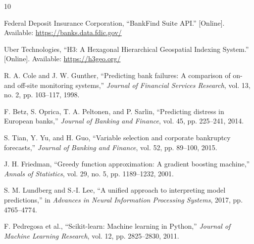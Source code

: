 \documentclass[conference]{IEEEtran}
\begin{document}
\begin{thebibliography}{10}

Federal Deposit Insurance Corporation, ``BankFind Suite API.''
[Online]. Available: \url{https://banks.data.fdic.gov/}

Uber Technologies, ``H3: A Hexagonal Hierarchical Geospatial Indexing
System.'' [Online]. Available: \url{https://h3geo.org/}

R. A. Cole and J. W. Gunther, ``Predicting bank failures: A comparison
of on- and off-site monitoring systems,'' \textit{Journal of Financial
Services Research}, vol. 13, no. 2, pp. 103--117, 1998.

F. Betz, S. Oprica, T. A. Peltonen, and P. Sarlin, ``Predicting distress
in European banks,'' \textit{Journal of Banking and Finance}, vol. 45,
pp. 225--241, 2014.

S. Tian, Y. Yu, and H. Guo, ``Variable selection and corporate bankruptcy
forecasts,'' \textit{Journal of Banking and Finance}, vol. 52, pp. 89--100,
2015.

J. H. Friedman, ``Greedy function approximation: A gradient boosting
machine,'' \textit{Annals of Statistics}, vol. 29, no. 5, pp. 1189--1232,
2001.

S. M. Lundberg and S.-I. Lee, ``A unified approach to interpreting model
predictions,'' in \textit{Advances in Neural Information Processing
Systems}, 2017, pp. 4765--4774.

F. Pedregosa et al., ``Scikit-learn: Machine learning in Python,''
\textit{Journal of Machine Learning Research}, vol. 12, pp. 2825--2830,
2011.

\end{thebibliography}
\end{document}
